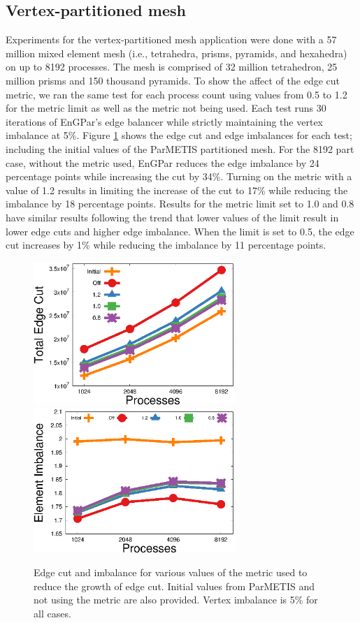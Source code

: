 \documentclass[conference]{IEEEtran}
\begin{document}
\subsection {Vertex-partitioned mesh}
Experiments for the vertex-partitioned mesh application were done with a 57 million
mixed element mesh (i.e., tetrahedra, prisms, pyramids, and hexahedra) on up to
8192 processes. The mesh is comprised of 32 million tetrahedron,
25 million prisms and 150 thousand pyramids. To show the affect of the edge cut
metric, we ran the same test for each process count using values from 0.5 to 1.2
for the metric limit as well as the metric not being used. Each test runs 30 iterations
of EnGPar's edge balancer while strictly maintaining the vertex imbalance at 5\%.
Figure \ref{fig:metric} shows the edge cut and edge imbalances for each
test; including the initial values of the ParMETIS partitioned mesh. For the
8192 part case, without
the metric used, EnGPar reduces the edge imbalance by 24 percentage points while increasing the cut by
34\%. Turning on the metric with a value of 1.2 results in limiting the increase of the cut to
17\% while reducing the imbalance by 18 percentage points. Results for the metric limit set to 1.0
and 0.8 have similar results following the trend that lower values of the limit result
in lower edge cuts and higher edge imbalance. When the limit is set to 0.5, the edge cut
increases by 1\% while reducing the imbalance by 11 percentage points.

\begin{figure}[!ht]
  \centering
  \includegraphics[width=3in]{plots/aepw_edgeCut_collapse_results/ecut_v_cores}
  \includegraphics[width=3in]{plots/aepw_edgeCut_collapse_results/eimb_v_cores}
  \caption{Edge cut and imbalance for various values of the metric used to reduce the growth of edge cut. Initial values from ParMETIS and not using the metric are also provided. Vertex imbalance is 5\% for all cases.}
  \label{fig:metric}
\end{figure}
\end{document}

